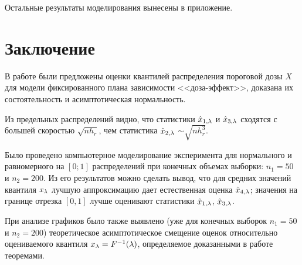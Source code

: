 \documentclass[a4paper,14pt,russian]{article}
\begin{document}
Остальные результаты моделирования вынесены в приложение.

\newpage

\section*{Заключение}
%
В работе были предложены оценки квантилей распределения пороговой дозы $X$ для модели фиксированного плана зависимости <<доза-эффект>>, доказана их состоятельность и асимптотическая нормальность.

Из предельных распределений видно, что статистики $\hat{x}_{1,\lambda}$ и $\hat{x}_{3,\lambda}$ сходятся с большей скоростью $ \sqrt{nh_r}$, чем статистика $\hat{x}_{2,\lambda}$ $ \sim\sqrt{nh_r^3}$.

Было проведено компьютерное моделирование эксперимента для нормального и равномерного на $[0;1]$ распределений при конечных объемах выборки: $n_1 = 50$ и $n_2=200$. Из его результатов можно сделать вывод, что для средних значений квантиля $x_\lambda$ лучшую аппроксимацию дает естественная оценка $\hat{x}_{4,\lambda}$; значения на границе отрезка $[0,1]$ лучше оценивают статистики $\hat{x}_{1,\lambda}$, $\hat{x}_{3,\lambda}$.

При анализе графиков было также выявлено (уже для конечных выборок $n_1 = 50$ и $n_2 = 200$) теоретическое асимптотическое смещение оценок относительно оцениваемого квантиля  $x_\lambda = F^{-1}(\lambda)$, определяемое доказанными в работе теоремами.


\newpage
\end{document}
